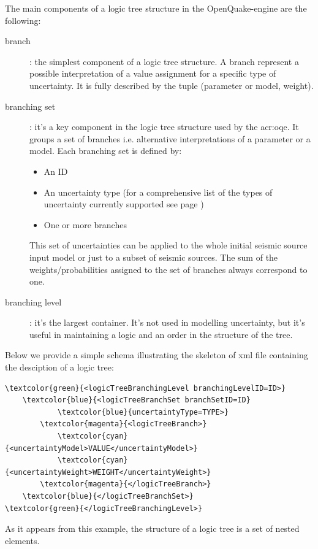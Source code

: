The main components of a logic tree structure in the OpenQuake-engine are 
the following:
\begin{description}
    \item[branch]: the simplest component of a logic tree structure. 
    A branch represent a possible interpretation of a value assignment for
    a specific type of uncertainty. It is fully described by the tuple 
    (parameter or model, weight).

    \item[branching set]: it's a key component in the logic tree structure 
    used by the \gls{acr:oqe}. It groups a set of branches i.e. 
    alternative interpretations of a parameter or a model. Each branching
    set is defined by:
    \begin{itemize}
        \item An ID
        \item An uncertainty type (for a comprehensive list of the types of 
        uncertainty currently supported see page \pageref{list_epistemic_unc})
        \item One or more branches
    \end{itemize}

    This set of uncertainties can be applied to the whole initial 
    seismic source input model or just to a subset of seismic sources.
    The sum of the weights/probabilities assigned to the set 
    of branches always correspond to one.

    \item[branching level]: it's the largest container. It's not used in 
    modelling uncertainty, but it's useful in maintaining a logic and an 
    order in the structure of the tree.
\end{description}

Below we provide a simple schema illustrating the skeleton of xml file 
containing the desciption of a logic tree:
\begin{Verbatim}[frame=single, commandchars=\\\{\}, fontsize=\small]
\textcolor{green}{<logicTreeBranchingLevel branchingLevelID=ID>}
    \textcolor{blue}{<logicTreeBranchSet branchSetID=ID}
            \textcolor{blue}{uncertaintyType=TYPE>}
        \textcolor{magenta}{<logicTreeBranch>}
            \textcolor{cyan}{<uncertaintyModel>VALUE</uncertaintyModel>}
            \textcolor{cyan}{<uncertaintyWeight>WEIGHT</uncertaintyWeight>}
        \textcolor{magenta}{</logicTreeBranch>}
    \textcolor{blue}{</logicTreeBranchSet>}
\textcolor{green}{</logicTreeBranchingLevel>}
\end{Verbatim}
As it appears from this example, the structure of a logic 
tree is a set of nested elements.


